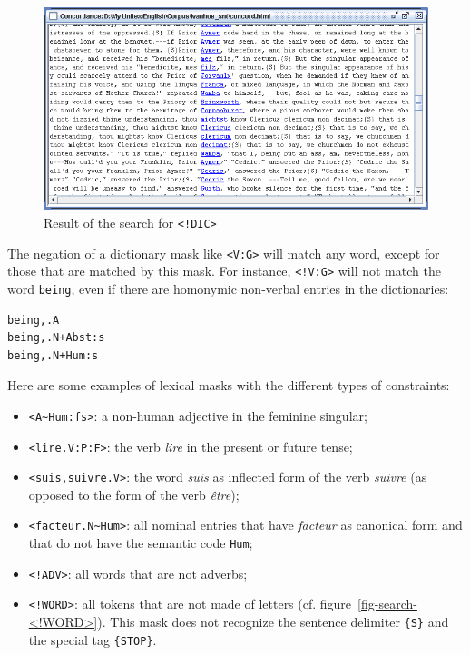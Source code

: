 \begin{figure}[!ht]
\begin{center}
\includegraphics[width=15cm]{resources/img/fig4-1.png}
\caption{Result of the search for \texttt{<!DIC>}\label{fig-search-<!DIC>}}
\end{center}
\end{figure}

\bigskip
\noindent The negation of a dictionary mask like \verb+<V:G>+ will match any
word, except for those that are matched by this mask. For instance, \verb+<!V:G>+ will not
match the word \verb+being+, even if there are homonymic non-verbal entries in
the dictionaries:

\begin{verbatim}
being,.A
being,.N+Abst:s
being,.N+Hum:s
\end{verbatim}

\noindent Here are some examples of lexical masks with the different types of constraints:

\begin{itemize}
  \item \verb$<A~Hum:fs>$: a non-human adjective in the feminine singular;
  \item \verb+<lire.V:P:F>+: the verb \textit{lire} in the present or future
  tense;
  \item \verb$<suis,suivre.V>$: the word \textit{suis} as inflected form of the
  verb \textit{suivre} (as opposed to the form of the verb \textit{\^etre});
  \item \verb$<facteur.N~Hum>$: all nominal entries that have \textit{facteur} as
  canonical form and that do not have the semantic code \verb+Hum+;
  \item \verb$<!ADV>$: all words that are not adverbs;
  \item \verb$<!WORD>$: all tokens that are not made of letters (cf.
  figure~\ref{fig-search-<!WORD>}). This mask does not recognize the sentence
  delimiter \verb+{S}+ and the special tag \verb+{STOP}+.
\end{itemize}

